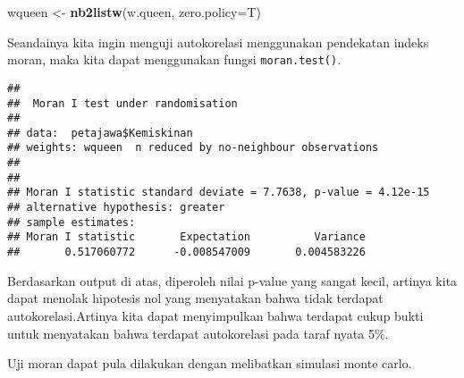 \documentclass[
]{book}
\newenvironment{Shaded}{\begin{snugshade}}{\end{snugshade}}
\newcommand{\CommentTok}[1]{\textcolor[rgb]{0.56,0.35,0.01}{\textit{#1}}}
\newcommand{\DataTypeTok}[1]{\textcolor[rgb]{0.13,0.29,0.53}{#1}}
\newcommand{\DecValTok}[1]{\textcolor[rgb]{0.00,0.00,0.81}{#1}}
\newcommand{\KeywordTok}[1]{\textcolor[rgb]{0.13,0.29,0.53}{\textbf{#1}}}
\newcommand{\NormalTok}[1]{#1}
\newcommand{\OperatorTok}[1]{\textcolor[rgb]{0.81,0.36,0.00}{\textbf{#1}}}
\newcommand{\StringTok}[1]{\textcolor[rgb]{0.31,0.60,0.02}{#1}}
\begin{document}
\begin{Shaded}
\begin{Highlighting}[]
\NormalTok{wqueen \textless{}{-}}\StringTok{ }\KeywordTok{nb2listw}\NormalTok{(w.queen, }\DataTypeTok{zero.policy=}\NormalTok{T)}
\end{Highlighting}
\end{Shaded}

Seandainya kita ingin menguji autokorelasi menggunakan pendekatan indeks moran, maka kita dapat menggunakan fungsi \texttt{moran.test()}.

\begin{Shaded}
\end{Shaded}

\begin{verbatim}
## 
##  Moran I test under randomisation
## 
## data:  petajawa$Kemiskinan  
## weights: wqueen  n reduced by no-neighbour observations
##   
## 
## Moran I statistic standard deviate = 7.7638, p-value = 4.12e-15
## alternative hypothesis: greater
## sample estimates:
## Moran I statistic       Expectation          Variance 
##       0.517060772      -0.008547009       0.004583226
\end{verbatim}

Berdasarkan output di atas, diperoleh nilai p-value yang sangat kecil, artinya kita dapat menolak hipotesis nol yang menyatakan bahwa tidak terdapat autokorelasi.Artinya kita dapat menyimpulkan bahwa terdapat cukup bukti untuk menyatakan bahwa terdapat autokorelasi pada taraf nyata 5\%.

Uji moran dapat pula dilakukan dengan melibatkan simulasi monte carlo.

\begin{Shaded}
\end{Shaded}
\end{document}
